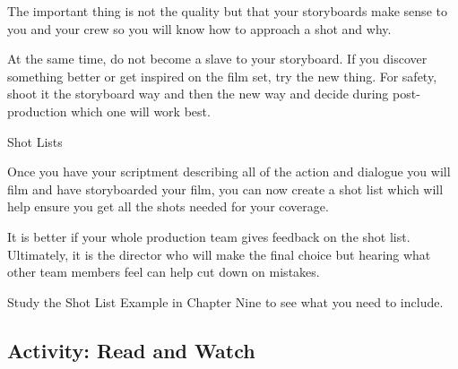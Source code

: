 \documentclass[
]{book}
\begin{document}
The important thing is not the quality but that your storyboards make sense to you and your crew so you will know how to approach a shot and why.

At the same time, do not become a slave to your storyboard. If you discover something better or get inspired on the film set, try the new thing. For safety, shoot it the storyboard way and then the new way and decide during post-production which one will work best.

{Shot Lists}

Once you have your scriptment describing all of the action and dialogue you will film and have storyboarded your film, you can now create a shot list which will help ensure you get all the shots needed for your coverage.

It is better if your whole production team gives feedback on the shot list. Ultimately, it is the director who will make the final choice but hearing what other team members feel can help cut down on mistakes.

Study the Shot List Example in Chapter Nine to see what you need to include.

\hypertarget{activity-read-and-watch-3}{%
\subsection*{Activity: Read and Watch}\label{activity-read-and-watch-3}}
\end{document}
